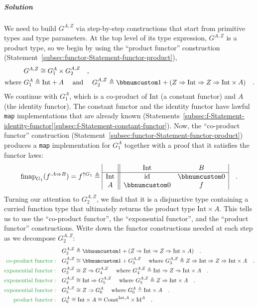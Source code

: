 \subparagraph{Solution}

We need to build $G^{A,Z}$ via step-by-step constructions that start
from primitive types and type parameters. At the top level of its
type expression, $G^{A,Z}$ is a product type, so we begin by using
the ``product functor'' construction (Statement~\ref{subsec:functor-Statement-functor-product}),
\begin{align*}
 & G^{A,Z}\cong G_{1}^{A}\times G_{2}^{A,Z}\quad,\\
\text{where } & G_{1}^{A}\triangleq\text{Int}+A\quad\text{ and }\quad G_{2}^{A,Z}\triangleq\bbnum 1+(Z\Rightarrow\text{Int}\Rightarrow Z\Rightarrow\text{Int}\times A)\quad.
\end{align*}
We continue with $G_{1}^{A}$, which is a co-product of $\text{Int}$
(a constant functor) and $A$ (the identity functor). The constant
functor and the identity functor have lawful \lstinline!map! implementations
that are already known (Statements~\ref{subsec:f-Statement-identity-functor}\textendash \ref{subsec:f-Statement-constant-functor}).
Now, the ``co-product functor'' construction (Statement~\ref{subsec:functor-Statement-functor-product})
produces a \lstinline!map! implementation for $G_{1}^{A}$ together
with a proof that it satisfies the functor laws:
\[
\text{fmap}_{G_{1}}(f^{:A\Rightarrow B})=f^{\uparrow G_{1}}\triangleq\begin{array}{|c||cc|}
 & \text{Int} & B\\
\hline \text{Int} & \text{id} & \bbnum 0\\
A & \bbnum 0 & f
\end{array}\quad.
\]
Turning our attention to $G_{2}^{A,Z}$, we find that it is a disjunctive
type containing a curried function type that ultimately returns the
product type $\text{Int}\times A$. This tells us to use the ``co-product
functor'', the ``exponential functor'', and the ``product functor''
constructions. Write down the functor constructions needed at each
step as we decompose $G_{2}^{A,Z}$:
\begin{align*}
 & G_{2}^{A,Z}\triangleq\bbnum 1+(Z\Rightarrow\text{Int}\Rightarrow Z\Rightarrow\text{Int}\times A)\quad.\\
{\color{greenunder}\text{co-product functor}:}\quad & G_{2}^{A,Z}\cong\bbnum 1+G_{3}^{A,Z}\quad\text{ where }G_{3}^{A,Z}\triangleq Z\Rightarrow\text{Int}\Rightarrow Z\Rightarrow\text{Int}\times A\quad.\\
{\color{greenunder}\text{exponential functor}:}\quad & G_{3}^{A,Z}\cong Z\Rightarrow G_{4}^{A,Z}\quad\text{ where }G_{4}^{A,Z}\triangleq\text{Int}\Rightarrow Z\Rightarrow\text{Int}\times A\quad.\\
{\color{greenunder}\text{exponential functor}:}\quad & G_{4}^{A,Z}\cong\text{Int}\Rightarrow G_{5}^{A,Z}\quad\text{ where }G_{5}^{A,Z}\triangleq Z\Rightarrow\text{Int}\times A\quad.\\
{\color{greenunder}\text{exponential functor}:}\quad & G_{5}^{A,Z}\cong Z\Rightarrow G_{6}^{A}\quad\text{ where }G_{6}^{A}\triangleq\text{Int}\times A\quad.\\
{\color{greenunder}\text{product functor}:}\quad & G_{6}^{A}\cong\text{Int}\times A\cong\text{Const}^{\text{Int},A}\times\text{Id}^{A}\quad.
\end{align*}
